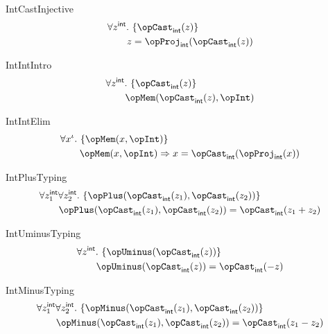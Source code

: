 \documentclass[11pt, a4paper, oneside]{article}
\begin{document}
\begin{axioms}
\item[IntCastInjective] \[
        \begin{aligned}
            &\forall z^\int.\, \st{ \opCast_\int(z) } \\
            &\qquad z = \opProj_\int(\opCast_\int(z))
        \end{aligned}
    \]

\item[IntIntIntro] \[
        \begin{aligned}
            &\forall z^\int.\, \st{ \opCast_\int(z) } \\
            &\qquad \opMem(\opCast_\int(z), \opInt)
        \end{aligned}
    \]

\item[IntIntElim] \[
        \begin{aligned}
            &\forall x^\idv.\, \st{ \opMem(x, \opInt) } \\
            &\qquad \opMem(x, \opInt) \imp x = \opCast_\int(\opProj_\int(x))
        \end{aligned}
    \]

\item[IntPlusTyping] \[
        \begin{aligned}
            &\forall z_1^\int \forall z_2^\int.\, \st{ \opPlus(\opCast_\int(z_1), \opCast_\int(z_2)) } \\
            &\qquad \opPlus(\opCast_\int(z_1), \opCast_\int(z_2)) = \opCast_\int(z_1 + z_2)
        \end{aligned}
    \]

\item[IntUminusTyping] \[
        \begin{aligned}
            &\forall z^\int.\, \st{ \opUminus(\opCast_\int(z)) } \\
            &\qquad \opUminus(\opCast_\int(z)) = \opCast_\int(- z)
        \end{aligned}
    \]

\item[IntMinusTyping] \[
        \begin{aligned}
            &\forall z_1^\int \forall z_2^\int.\, \st{ \opMinus(\opCast_\int(z_1), \opCast_\int(z_2)) } \\
            &\qquad \opMinus(\opCast_\int(z_1), \opCast_\int(z_2)) = \opCast_\int(z_1 - z_2)
        \end{aligned}
    \]


\end{axioms}
\end{document}
